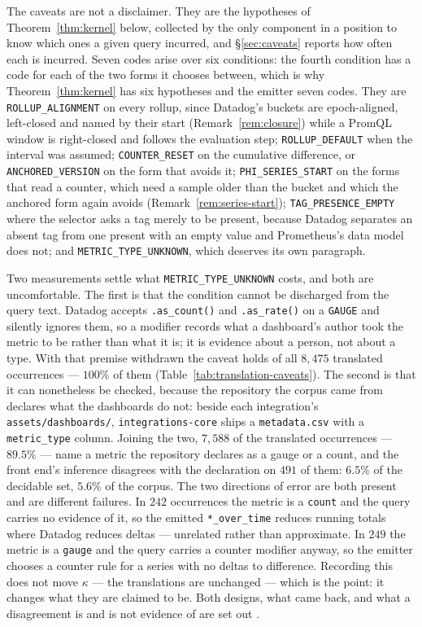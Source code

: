 \noindent
The caveats are not a disclaimer. They are the hypotheses of
Theorem~\ref{thm:kernel} below, collected by the only component in a position to know
which ones a given query incurred, and \S\ref{sec:caveats} reports how often each is
incurred. Seven codes arise over six conditions: the fourth condition has a code for
each of the two forms it chooses between, which is why Theorem~\ref{thm:kernel} has six
hypotheses and the emitter seven codes. They are
\texttt{ROLLUP\_ALIGNMENT} on every rollup, since Datadog's buckets are epoch-aligned,
left-closed and named by their start (Remark~\ref{rem:closure}) while a PromQL window is
right-closed and follows the evaluation step;
\texttt{ROLLUP\_DEFAULT} when the interval was assumed;
\texttt{COUNTER\_RESET} on the cumulative difference, or \texttt{ANCHORED\_VERSION} on the
form that avoids it; \texttt{PHI\_SERIES\_START} on the forms that read a counter, which
need a sample older than the bucket and which the anchored form again avoids
(Remark~\ref{rem:series-start}); \texttt{TAG\_PRESENCE\_EMPTY} where the selector asks a
tag merely to be present, because Datadog separates an absent tag from one present with
an empty value and Prometheus's data model does not; and
\texttt{METRIC\_TYPE\_UNKNOWN}, which deserves its own paragraph.

Two measurements settle what \texttt{METRIC\_TYPE\_UNKNOWN} costs, and both are
uncomfortable. The first is that the condition cannot be discharged from the query text.
Datadog accepts \texttt{.as\_count()} and \texttt{.as\_rate()} on a \texttt{GAUGE} and
silently ignores them, so a modifier records what a dashboard's author took the metric to
be rather than what it is; it is evidence about a person, not about a type. With that
premise withdrawn the caveat holds of all $8{,}475$ translated occurrences --- $100\%$ of
them (Table~\ref{tab:translation-caveats}). The second is that it can nonetheless be
checked, because the repository the corpus came from declares what the dashboards do not:
beside each integration's \texttt{assets\slash dashboards\slash},
\texttt{integrations-core} ships a \texttt{metadata.csv} with a \texttt{metric\_type}
column. Joining the two, $7{,}588$ of the translated occurrences --- $89.5\%$ --- name a
metric the repository declares as a gauge or a count, and the front end's inference
disagrees with the declaration on $491$ of them: $6.5\%$ of the decidable set, $5.6\%$ of
the corpus. The two directions of error are both present and are different failures. In
$242$ occurrences the metric is a \texttt{count} and the query carries no evidence of it,
so the emitted \texttt{*\_over\_time} reduces running totals where Datadog reduces deltas
--- unrelated rather than approximate. In $249$ the metric is a \texttt{gauge} and the
query carries a counter modifier anyway, so the emitter chooses a counter rule for a
series with no deltas to difference. Recording this does not move $\kappa$ --- the
translations are unchanged --- which is the point: it changes what they are claimed to
be. Both designs, what came back, and what a disagreement is and is not evidence of are
set out .

